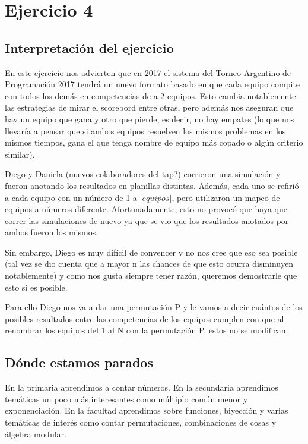 \section{Ejercicio 4}

\subsection{Interpretación del ejercicio}

	En este ejercicio nos advierten que en 2017 el sistema del Torneo Argentino de Programación 2017 tendrá un nuevo formato basado en que cada equipo compite con todos los demás en competencias de a 2 equipos. Esto cambia notablemente las estrategias de mirar el scorebord entre otras, pero además nos aseguran que hay un equipo que gana y otro que pierde, es decir, no hay empates (lo que nos llevaría a pensar que si ambos equipos resuelven los mismos problemas en los mismos tiempos, gana el que tenga nombre de equipo más copado o algún criterio similar). \newline

	Diego y Daniela (nuevos colaboradores del tap?) corrieron una simulación y fueron anotando los resultados en planillas distintas. Además, cada uno se refirió a cada equipo con un número de 1 a $|equipos|$, pero utilizaron un mapeo de equipos a números diferente. Afortunadamente, esto no provocó que haya que correr las simulaciones de nuevo ya que se vio que los resultados anotados por ambos fueron los mismos. \newline

	Sin embargo, Diego es muy difícil de convencer y no nos cree que eso sea posible (tal vez se dio cuenta que a mayor n las chances de que esto ocurra disminuyen notablemente) y como nos gusta siempre tener razón, queremos demostrarle que esto sí es posible. \newline

	Para ello Diego nos va a dar una permutación P y le vamos a decir cuántos de los posibles resultados entre las competencias de los equipos cumplen con que al renombrar los equipos del 1 al N con la permutación P, estos no se modifican. \newline

\subsection{Dónde estamos parados}

	En la primaria aprendimos a contar números. En la secundaria aprendimos temáticas un poco más interesantes como múltiplo común menor y exponenciación. En la facultad aprendimos sobre funciones, biyección y varias temáticas de interés como contar permutaciones, combinaciones de cosas y álgebra modular. \newline 

